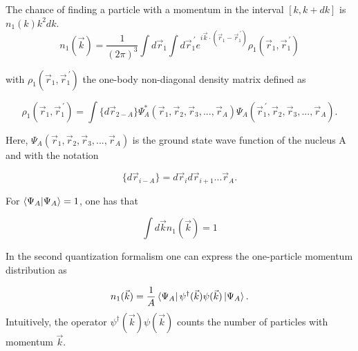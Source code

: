\documentclass[12pt]{article}
\begin{document}
The chance of finding a particle with a momentum in the interval $[k,k+dk]$ is $n_1(k) k^2dk$.
\begin{equation} \label{eq:one_patricle_distr}
	n_1(\vec{k})=\frac{1}{(2\pi)^3}\int d\vec{r}_1 \int d\vec{r}_1^{\ \prime} e^{i\vec{k}\cdot (\vec{r}_1-\vec{r}^{\ \prime}_1)}\rho_1(\vec{r}_1,\vec{r}_1^{\ \prime})
\end{equation}

with $\rho_1(\vec{r}_1,\vec{r}^{\ \prime}_1)$  the one-body non-diagonal density matrix defined as


\begin{equation}
\rho_1(\vec{r}_1,\vec{r}^{\ \prime}_1) = \int \{d\vec{r}_{2-A}\} \Psi^*_A(\vec{r}_1,\vec{r}_2,\vec{r}_3, ... ,\vec{r}_A)\Psi_A(\vec{r}_1^{\ \prime},\vec{r}_2,\vec{r}_3, ... ,\vec{r}_A).
\end{equation}



Here, $\Psi_A(\vec{r}_1,\vec{r}_2,\vec{r}_3, ... ,\vec{r}_A)$ is the ground state wave function of the nucleus A and with the notation 

\begin{equation}
\{d\vec{r}_{i-A}\}  = d\vec{r}_i d\vec{r}_{i+1}...\vec{r}_A.
\end{equation}
 


For $\braket{\Psi_A|\Psi_A}=1$, one has that


\begin{equation}
\int d\vec{k}n_1(\vec{k})=1
\end{equation}

In the second quantization formalism one can express the one-particle momentum distribution as

\begin{equation}
n_1(\vec{k})= \frac{1}{A}\bra{\Psi_A} \psi^\dagger(\vec{k}) \psi(\vec{k})\ket{\Psi_A}.
\end{equation}
Intuitively, the operator $\psi^\dagger(\vec{k}) \psi(\vec{k})$ counts the number of particles with momentum $\vec{k}$.
\end{document}

